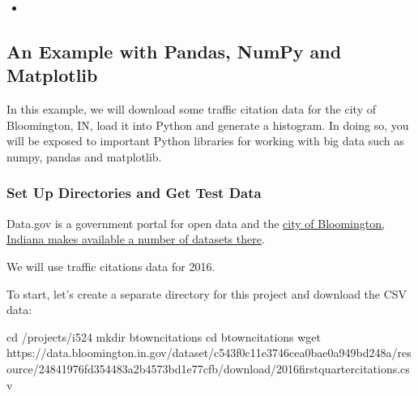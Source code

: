 \begin{sphinxShadowBox}
\begin{itemize}
\begin{itemize}
\begin{itemize}
\item {} 
\label{\detokenize{lesson/prg/python_big_data:id25}}{\hyperref[\detokenize{lesson/prg/python_big_data:network-and-graphs}]{}}

\item {} 
\label{\detokenize{lesson/prg/python_big_data:id26}}{\hyperref[\detokenize{lesson/prg/python_big_data:rest}]{}}

\end{itemize}

\item {} 
\label{\detokenize{lesson/prg/python_big_data:id27}}{\hyperref[\detokenize{lesson/prg/python_big_data:other-examples}]{}}

\end{itemize}

\end{itemize}
\end{sphinxShadowBox}


\subsection{An Example with Pandas, NumPy and Matplotlib}
\label{\detokenize{lesson/prg/python_big_data:an-example-with-pandas-numpy-and-matplotlib}}
In this example, we will download some traffic citation data for the
city of Bloomington, IN, load it into Python and generate a
histogram. In doing so, you will be exposed to important Python
libraries for working with big data such as numpy,
pandas and matplotlib.


\subsubsection{Set Up Directories and Get Test Data}
\label{\detokenize{lesson/prg/python_big_data:set-up-directories-and-get-test-data}}
Data.gov is a government portal for open data and the \href{https://catalog.data.gov/dataset?organization\_type=City+Government\&organization=city-of-bloomington\&\_organization\_limit=0}{city of
Bloomington, Indiana makes available a number of datasets there}.

We will use traffic citations data for 2016.

To start, let's create a separate directory for this project and
download the CSV data:

\begin{sphinxVerbatim}[commandchars=\\\{\}]
\PYGZdl{} cd \PYGZti{}/projects/i524
\PYGZdl{} mkdir btown\PYGZhy{}citations
\PYGZdl{} cd btown\PYGZhy{}citations
\PYGZdl{} wget https://data.bloomington.in.gov/dataset/c543f0c1\PYGZhy{}1e37\PYGZhy{}46ce\PYGZhy{}a0ba\PYGZhy{}e0a949bd248a/resource/24841976\PYGZhy{}fd35\PYGZhy{}4483\PYGZhy{}a2b4\PYGZhy{}573bd1e77cfb/download/2016\PYGZhy{}first\PYGZhy{}quarter\PYGZhy{}citations.csv
\end{sphinxVerbatim}

